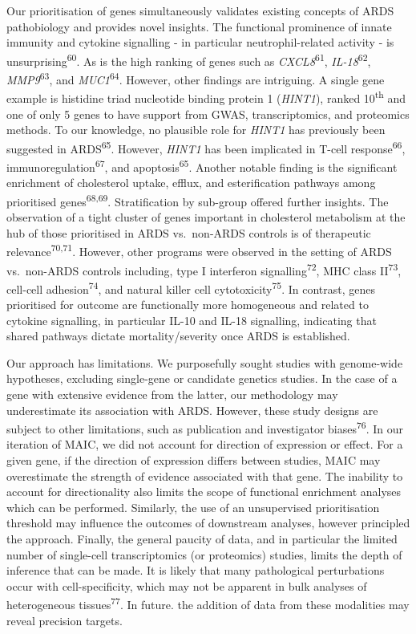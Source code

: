 \documentclass[
  11,
  a4paper,
]{article}
\begin{document}
Our prioritisation of genes simultaneously validates existing concepts
of ARDS pathobiology and provides novel insights. The functional
prominence of innate immunity and cytokine signalling - in particular
neutrophil-related activity - is unsurprising\textsuperscript{60}. As is
the high ranking of genes such as \emph{CXCL8}\textsuperscript{61},
\emph{IL-18}\textsuperscript{62}, \emph{MMP9}\textsuperscript{63}, and
\emph{MUC1}\textsuperscript{64}. However, other findings are intriguing.
A single gene example is histidine triad nucleotide binding protein 1
(\emph{HINT1}), ranked 10\textsuperscript{th} and one of only 5 genes to
have support from GWAS, transcriptomics, and proteomics methods. To our
knowledge, no plausible role for \emph{HINT1} has previously been
suggested in ARDS\textsuperscript{65}. However, \emph{HINT1} has been
implicated in T-cell response\textsuperscript{66},
immunoregulation\textsuperscript{67}, and apoptosis\textsuperscript{65}.
Another notable finding is the significant enrichment of cholesterol
uptake, efflux, and esterification pathways among prioritised
genes\textsuperscript{68,69}. Stratification by sub-group offered
further insights. The observation of a tight cluster of genes important
in cholesterol metabolism at the hub of those prioritised in ARDS
vs.~non-ARDS controls is of therapeutic
relevance\textsuperscript{70,71}. However, other programs were observed
in the setting of ARDS vs.~non-ARDS controls including, type I
interferon signalling\textsuperscript{72}, MHC class
II\textsuperscript{73}, cell-cell adhesion\textsuperscript{74}, and
natural killer cell cytotoxicity\textsuperscript{75}. In contrast, genes
prioritised for outcome are functionally more homogeneous and related to
cytokine signalling, in particular IL-10 and IL-18 signalling,
indicating that shared pathways dictate mortality/severity once ARDS is
established.

Our approach has limitations. We purposefully sought studies with
genome-wide hypotheses, excluding single-gene or candidate genetics
studies. In the case of a gene with extensive evidence from the latter,
our methodology may underestimate its association with ARDS. However,
these study designs are subject to other limitations, such as
publication and investigator biases\textsuperscript{76}. In our
iteration of MAIC, we did not account for direction of expression or
effect. For a given gene, if the direction of expression differs between
studies, MAIC may overestimate the strength of evidence associated with
that gene. The inability to account for directionality also limits the
scope of functional enrichment analyses which can be performed.
Similarly, the use of an unsupervised prioritisation threshold may
influence the outcomes of downstream analyses, however principled the
approach. Finally, the general paucity of data, and in particular the
limited number of single-cell transcriptomics (or proteomics) studies,
limits the depth of inference that can be made. It is likely that many
pathological perturbations occur with cell-specificity, which may not be
apparent in bulk analyses of heterogeneous tissues\textsuperscript{77}.
In future. the addition of data from these modalities may reveal
precision targets.
\end{document}
